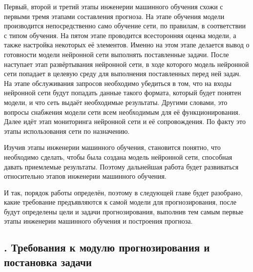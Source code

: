 {  \par \redline Первый, второй и третий этапы инженерии машинного обучения схожи с первыми тремя этапами составления прогноза. На этапе обучения модели производится непосредственно само обучение сети, по правилам, в соответствии с типом обучения. На пятом этапе проводится всесторонняя оценка модели, а также настройка некоторых её элементов. Именно на этом этапе делается вывод о готовности модели нейронной сети выполнять поставленные задачи. После наступает этап развёртывания нейронной сети, в ходе которого модель нейронной сети попадает в целевую среду для выполнения поставленных перед ней задач. На этапе обслуживания запросов необходимо убедиться в том, что на входы нейронной сети будут попадать данные такого формата, который будет понятен модели, и что сеть выдаёт необходимые результаты. Другими словами, это вопросы снабжения модели сети всем необходимым для её функционирования. Далее идёт этап мониторинга нейронной сети и её сопровождения. По факту это этапы использования сети по назначению.    

  \par \redline Изучив этапы инженерии машинного обучения, становится понятно, что необходимо сделать, чтобы была создана модель нейронной сети, способная давать приемлемые результаты. Поэтому дальнейшая работа будет развиваться относительно этапов инженерии машинного обучения.

  \par \redline И так, порядок работы определён, поэтому в следующей главе будет разобрано, какие требование предъявляются к самой модели для прогнозирования, после будут определены цели и задачи прогнозирования, выполнив тем самым первые этапы инженерии машинного обучения и построения прогноза.

  \par
}

\subtitlespace

\subsection*{
  \gostTitleFont
  \redline
  \thechaptercntr .\thesubchaptercntr \spc
  Требования к модулю прогнозирования и постановка задачи
} \addtocounter{subchaptercntr}{1}

\subtitlespace


